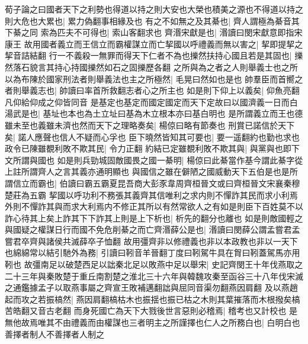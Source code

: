 荀子論之曰國者天下之利勢也得道以持之則大安也大榮也積美之源也不得道以持之則大危也大累也|{
	累力偽翻事相緣及也}
有之不如無之及其綦也|{
	齊人謂極為綦音其下綦之同}
索為匹夫不可得也|{
	索山客翻求也}
齊湣宋獻是也|{
	湣讀曰閔宋獻意即指宋康王}
故用國者義立而王信立而霸權謀立而亡挈國以呼禮義而無以害之|{
	挈即提挈之挈音詰結翻}
行一不義殺一無罪而得天下仁者不為也擽然扶持心國且若是其固也|{
	擽然落石貌言其持心持國擽然如石之固擽歷各翻}
之所與為之者之人則舉義士也之所以為布陳於國家刑法者則舉義法也主之所極然|{
	毛晃曰然如也是也}
帥羣臣而首嚮之者則舉義志也|{
	帥讀曰率首所救翻志者心之所主也}
如是則下仰上以義矣|{
	仰魚亮翻凡仰給仰成之仰皆同音}
是基定也基定而國定國定而天下定故曰以國濟義一日而白湯武是也|{
	基址也本也為土立址曰基為木立根本亦曰基白明也}
是所謂義立而王也德雖未至也義雖未濟也然而天下之理略奏矣|{
	楊倞曰略有節奏也}
刑賞已諾信於天下矣|{
	諾人應聲也信人不疑而心孚也}
臣下曉然皆知其可要也|{
	要一遥翻約也勤也求也}
政令已陳雖覩利敗不欺其民|{
	令力正翻}
約結已定雖覩利敗不欺其與|{
	與黨與也即下文所謂與國也}
如是則兵勁城固敵國畏之國一綦明|{
	楊倞曰此綦當作基今謂此綦字從上註所謂齊人之言其義亦通明顯也}
與國信之雖在僻陋之國威動天下五伯是也是所謂信立而霸也|{
	伯讀曰霸五霸夏昆吾商大彭豕韋周齊桓晉文或曰齊桓晉文宋襄秦穆楚莊為五霸}
挈國以呼功利不務張其義齊其信唯利之求内則不憚詐其民而求小利焉外則不憚詐其與而求大利焉内不修正其所以有然常欲人之有如是則臣下百姓莫不以詐心待其上矣上詐其下下詐其上則是上下析也|{
	析先的翻分也離也}
如是則敵國輕之與國疑之權謀日行而國不免危削綦之而亡齊湣薛公是也|{
	湣讀曰閔薛公謂孟嘗君孟嘗君卒齊與諸侯共滅薛卒子恤翻}
故用彊齊非以修禮義也非以本政教也非以一天下也綿綿常以結引馳外為務|{
	引讀曰靷音羊晉翻丁度曰靷駕牛具在胷曰靷蓋駕馬亦用靷也}
故彊南足以破楚西足以詘秦北足以敗燕中足以舉宋|{
	史記齊閔王十年伐燕取之二十三年與秦敗楚于重丘南割楚之淮北三十六年與韓魏攻秦至函谷三十八年伐宋滅之通鑑據孟子以取燕事屬之齊宣王敗補邁翻詘與屈同音渠勿翻燕因肩翻}
及以燕趙起而攻之若振槁然|{
	燕因肩翻槁枯木也振揺也振已枯之木則其葉摧落而木根撥矣槁苦皓翻又音古老翻}
而身死國亡為天下大戮後世言惡則必稽焉|{
	稽考也又計校也}
是無他故焉唯其不由禮義而由權謀也三者明主之所謹擇也仁人之所務白也|{
	白明白也}
善擇者制人不善擇者人制之

